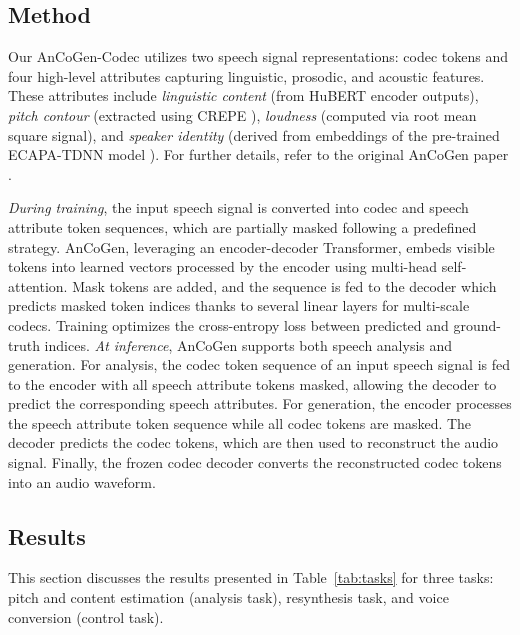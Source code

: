 \documentclass{Interspeech}
\begin{document}
\vspace*{-.2cm}
\subsection{Method}

Our AnCoGen-Codec utilizes two speech signal representations: codec tokens and four high-level attributes capturing linguistic, prosodic, and acoustic features. These attributes include \emph{linguistic content} (from HuBERT encoder outputs), \emph{pitch contour} (extracted using CREPE \cite{kim2018crepe}), \emph{loudness} (computed via root mean square signal), and \emph{speaker identity} (derived from embeddings of the pre-trained ECAPA-TDNN model \cite{desplanques2020ecapa}). For further details, refer to the original AnCoGen paper \cite{sadok2024ancogen}.


\emph{During training}, the input speech signal is converted into codec and speech attribute token sequences, which are partially masked following a predefined strategy. AnCoGen, leveraging an encoder-decoder Transformer, embeds visible tokens into learned vectors processed by the encoder using multi-head self-attention. Mask tokens are added, and the sequence is fed to the decoder which predicts masked token indices thanks to several linear layers for multi-scale codecs. Training optimizes the cross-entropy loss between predicted and ground-truth indices. \emph{At inference}, AnCoGen supports both speech analysis and generation. For analysis, the codec token sequence of an input speech signal is fed to the encoder with all speech attribute tokens masked, allowing the decoder to predict the corresponding speech attributes. For generation, the encoder processes the speech attribute token sequence while all codec tokens are masked. The decoder predicts the codec tokens, which are then used to reconstruct the audio signal. Finally, the frozen codec decoder converts the reconstructed codec tokens into an audio waveform.

\vspace*{-.2cm}
\subsection{Results}
This section discusses the results presented in Table~\ref{tab:tasks} for three tasks: pitch and content estimation (analysis task), resynthesis task, and voice conversion (control task).
\end{document}
